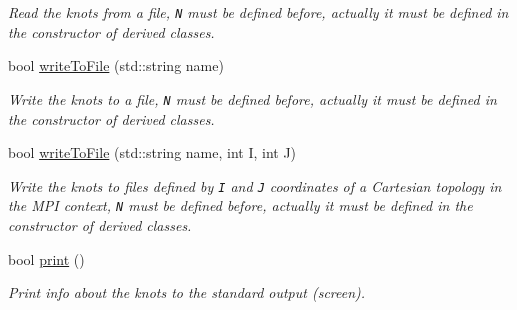 \begin{CompactItemize}
\begin{CompactList}\small\item\em Read the knots from a file, {\tt N} must be defined before, actually it must be defined in the constructor of derived classes. \item\end{CompactList}\item 
\hypertarget{classKnots_76dabed643e5b6ec508d67400faa086e}{
bool \hyperlink{classKnots_76dabed643e5b6ec508d67400faa086e}{writeToFile} (std::string name)}
\label{classKnots_76dabed643e5b6ec508d67400faa086e}

\begin{CompactList}\small\item\em Write the knots to a file, {\tt N} must be defined before, actually it must be defined in the constructor of derived classes. \item\end{CompactList}\item 
\hypertarget{classKnots_92c37cded807798073bf34eecb3eaaca}{
bool \hyperlink{classKnots_92c37cded807798073bf34eecb3eaaca}{writeToFile} (std::string name, int I, int J)}
\label{classKnots_92c37cded807798073bf34eecb3eaaca}

\begin{CompactList}\small\item\em Write the knots to files defined by {\tt I} and {\tt J} coordinates of a Cartesian topology in the MPI context, {\tt N} must be defined before, actually it must be defined in the constructor of derived classes. \item\end{CompactList}\item 
\hypertarget{classKnots_65ff65d2a43ec814e0ad26d98df187c9}{
bool \hyperlink{classKnots_65ff65d2a43ec814e0ad26d98df187c9}{print} ()}
\label{classKnots_65ff65d2a43ec814e0ad26d98df187c9}

\begin{CompactList}\small\item\em Print info about the knots to the standard output (screen). \item\end{CompactList}\end{CompactItemize}
